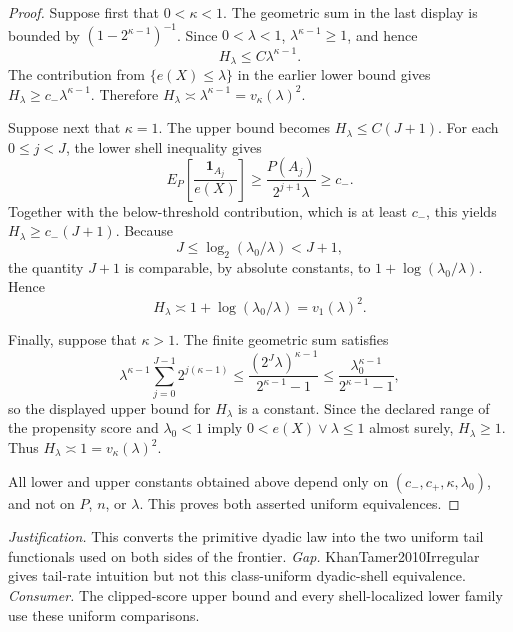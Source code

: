 \documentclass{article}
\begin{document}
\begin{proof}
Suppose first that \(0<\kappa<1\).  The geometric sum in the last display is bounded by \((1-2^{\kappa-1})^{-1}\).  Since \(0<\lambda<1\), \(\lambda^{\kappa-1}\geq1\), and hence
\[
 H_\lambda\leq C\lambda^{\kappa-1}.
\]
The contribution from \(\{e(X)\leq\lambda\}\) in the earlier lower bound gives \(H_\lambda\geq c_-\lambda^{\kappa-1}\).  Therefore \(H_\lambda\asymp\lambda^{\kappa-1}=v_\kappa(\lambda)^2\).

Suppose next that \(\kappa=1\).  The upper bound becomes \(H_\lambda\leq C(J+1)\).  For each \(0\leq j<J\), the lower shell inequality gives
\[
 E_P\!\left[\frac{\mathbf 1_{A_j}}{e(X)}\right]
 \geq \frac{P(A_j)}{2^{j+1}\lambda}
 \geq c_-.
\]
Together with the below-threshold contribution, which is at least \(c_-\), this yields \(H_\lambda\geq c_-(J+1)\).  Because
\[
 J\leq\log_2(\lambda_0/\lambda)<J+1,
\]
the quantity \(J+1\) is comparable, by absolute constants, to \(1+\log(\lambda_0/\lambda)\).  Hence
\[
 H_\lambda\asymp 1+\log(\lambda_0/\lambda)=v_1(\lambda)^2.
\]

Finally, suppose that \(\kappa>1\).  The finite geometric sum satisfies
\[
 \lambda^{\kappa-1}\sum_{j=0}^{J-1}2^{j(\kappa-1)}
 \leq \frac{(2^J\lambda)^{\kappa-1}}{2^{\kappa-1}-1}
 \leq \frac{\lambda_0^{\kappa-1}}{2^{\kappa-1}-1},
\]
so the displayed upper bound for \(H_\lambda\) is a constant.  Since the declared range of the propensity score and \(\lambda_0<1\) imply \(0<e(X)\vee\lambda\leq1\) almost surely, \(H_\lambda\geq1\).  Thus \(H_\lambda\asymp1=v_\kappa(\lambda)^2\).

All lower and upper constants obtained above depend only on \((c_-,c_+,\kappa,\lambda_0)\), and not on \(P\), \(n\), or \(\lambda\).  This proves both asserted uniform equivalences.
\end{proof}
\par\smallskip\noindent \textit{Justification.} This converts the primitive dyadic law into the two uniform tail functionals used on both sides of the frontier. \textit{Gap.} KhanTamer2010Irregular gives tail-rate intuition but not this class-uniform dyadic-shell equivalence. \textit{Consumer.} The clipped-score upper bound and every shell-localized lower family use these uniform comparisons.
\end{document}
